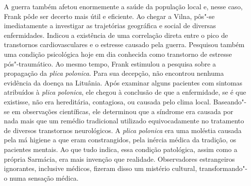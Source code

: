 A guerra também afetou enormemente a saúde da população local e, nesse
caso, Frank pôde ser decerto mais útil e eficiente. Ao chegar a Vilna,
pôs"-se imediatamente a investigar as trajetórias geográfica e social de
diversas enfermidades. Indicou a existência de uma correlação direta
entre o pico de transtornos cardiovasculares e o estresse causado pela
guerra. Pesquisou também uma condição psicológica hoje em dia conhecida
como transtorno de estresse pós"-traumático. Ao mesmo tempo, Frank
estimulou a pesquisa sobre a propagação da \textit{plica polonica}. Para
sua decepção, não encontrou nenhuma evidência da doença na Lituânia.
Após examinar alguns pacientes com sintomas atribuídos à \textit{plica
polonica}, ele chegou à conclusão de que a enfermidade, se é que
existisse, não era hereditária, contagiosa, ou causada pelo clima local.
Baseando"-se em observações científicas, ele determinou que a síndrome
era causada por nada mais que um remédio tradicional utilizado
equivocadamente no tratamento de diversos transtornos neurológicos. A
\textit{plica polonica} era uma moléstia causada pela má higiene a que
eram constrangidos, pela inércia médica da tradição, os pacientes
mentais. Ao que tudo indica, essa condição patológica, assim como a
própria Sarmácia, era mais invenção que realidade. Observadores
estrangeiros ignorantes, inclusive médicos, fizeram disso um mistério
cultural, transformando"-o numa sensação médica.

